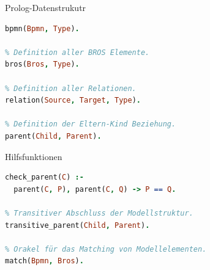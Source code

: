 \begin{frame}[fragile]{Prolog-Datenstrukutr}
\begin{lstlisting}[language=Prolog]
% Definition aller BPMN Elemente.
bpmn(Bpmn, Type).

% Definition aller BROS Elemente.
bros(Bros, Type).

% Definition aller Relationen.
relation(Source, Target, Type).

% Definition der Eltern-Kind Beziehung.
parent(Child, Parent).
\end{lstlisting}
\end{frame}
\begin{frame}[fragile]{Hilfsfunktionen}
\begin{lstlisting}[language=Prolog]
% Konsistenz der Eltern-Kind Beziehung.
check_parent(C) :- 
  parent(C, P), parent(C, Q) -> P == Q.

% Transitiver Abschluss der Modellstruktur.
transitive_parent(Child, Parent).

% Orakel für das Matching von Modellelementen.
match(Bpmn, Bros).
\end{lstlisting}
\end{frame}

